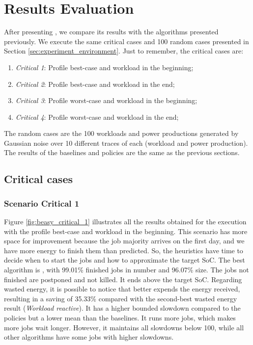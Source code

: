 \section{Results Evaluation}

After presenting \emph{\systemName}, we compare its results with the algorithms presented previously. We execute the same critical cases and 100 random cases presented in Section \ref{sec:experiment_environment}. Just to remember, the critical cases are:
\begin{enumerate}
    \item \emph{Critical 1}: Profile best-case and workload in the beginning;
    \item \emph{Critical 2}: Profile best-case and workload in the end;
    \item \emph{Critical 3}: Profile worst-case and workload in the beginning;
    \item \emph{Critical 4}: Profile worst-case and workload in the end;
\end{enumerate}

The random cases are the 100 workloads and power productions generated by Gaussian noise over 10 different traces of each (workload and power production). The results of the baselines and policies are the same as the previous sections.

\subsection{Critical cases}

\subsubsection{Scenario Critical 1}

Figure \ref{fig:beasy_critical_1} illustrates all the results obtained for the execution with the profile best-case and workload in the beginning. This scenario has more space for improvement because the job majority arrives on the first day, and we have more energy to finish them than predicted. So, the heuristics have time to decide when to start the jobs and how to approximate the target SoC. The best algorithm is \emph{\systemName}, with 99.01\% finished jobs in number and 96.07\% size. The jobs not finished are postponed and not killed. It ends above the target SoC. Regarding wasted energy, it is possible to notice that \emph{\systemName} better expends the energy received, resulting in a saving of 35.33\% compared with the second-best wasted energy result (\emph{Workload reactive}). It has a higher bounded slowdown compared to the policies but a lower mean than the baselines. It runs more jobs, which makes more jobs wait longer. However, it maintains all slowdowns below 100, while all other algorithms have some jobs with higher slowdowns.

